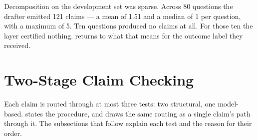 Decomposition on the development set was sparse. Across 80 questions the drafter
emitted 121 claims --- a mean of 1.51 and a median of 1 per question, with a
maximum of 5. Ten questions produced no claims at all. For those ten the layer
certified nothing.  returns to what that
means for the outcome label they received.

\section{Two-Stage Claim Checking}\label{sec:two-stage}

Each claim is routed through at most three tests: two structural, one
model-based.  states the procedure, and 
draws the same routing as a single claim's path through it. The subsections
that follow explain each test and the reason for their order.

